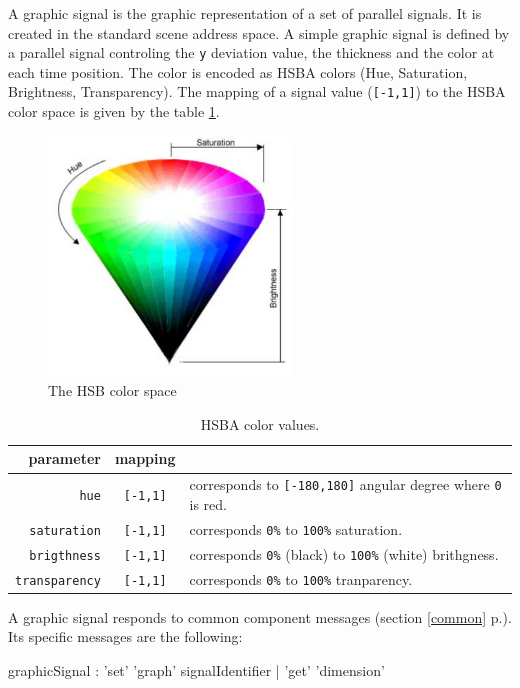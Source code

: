 \documentclass[a4paper,twoside]{report}
\newcommand{\fullref}[1]	{\ref{#1} p.\pageref{#1}}
\newcommand{\OSC}[1]		{\texttt{#1}}
\newcommand{\values}[1]	{\texttt{#1}}
\begin{document}
A graphic signal is the graphic representation of a set of parallel signals. It is created in the standard scene address space. A simple graphic signal is defined by a parallel signal controling the \values{y} deviation value, the thickness and the color at each time position. The color is encoded as HSBA colors (Hue, Saturation, Brightness, Transparency). The mapping of a signal value  (\values{[-1,1]}) to the HSBA color space is given by the table \ref{hsbamap}. 

\begin{figure}[h]
	\centering \includegraphics[width=65mm]{imgs/hsb}
 \caption{The HSB color space}
 \label{hsbfiug}
\end{figure}


\begin{table}[htdp]
\caption{HSBA color values.}
\begin{center}
\begin{tabular}{|r|cl|}
\hline
parameter & mapping & \\
\hline
\OSC{hue}				& \OSC{[-1,1]} & corresponds to \OSC{[-180,180]} angular degree where \OSC{0} is red. \\
\OSC{saturation}		& \OSC{[-1,1]} & corresponds \OSC{0\%} to \OSC{100\%} saturation. \\
\OSC{brigthness}		& \OSC{[-1,1]} & corresponds \OSC{0\%} (black) to \OSC{100\%} (white) brithgness. \\
\OSC{transparency}		& \OSC{[-1,1]} & corresponds \OSC{0\%} to \OSC{100\%} tranparency. \\
\hline
\end{tabular}
\end{center}
\label{hsbamap}
\end{table}



A graphic signal responds to common component messages (section \fullref{common}). Its specific messages are the following:
\begin{rail}
graphicSignal : 'set' 'graph' signalIdentifier 
			| 'get' 'dimension'
\end{rail}
\end{document}
